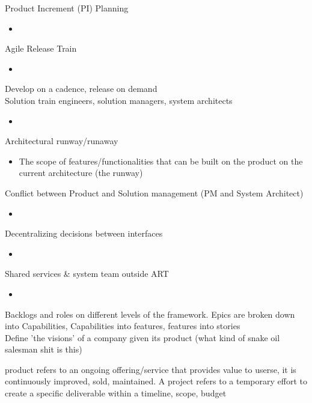 \documentclass[10pt]{article}
\begin{document}
Product Increment (PI) Planning
\begin{itemize}
\item 
\end{itemize}
Agile Release Train
\begin{itemize}
\item 
\end{itemize}
Develop on a cadence, release on demand\\
Solution train engineers, solution managers, system architects
\begin{itemize}
\item 
\end{itemize}
Architectural runway/runaway
\begin{itemize}
\item The scope of features/functionalities that can be built on the product on the current architecture (the runway)
\end{itemize}
Conflict between Product and Solution management (PM and System Architect)
\begin{itemize}
\item 
\end{itemize}
Decentralizing decisions between interfaces
\begin{itemize}
\item 
\end{itemize}
Shared services \& system team outside ART
\begin{itemize}
\item 
\end{itemize}
Backlogs and roles on different levels of the framework. Epics are broken down into Capabilities, Capabilities into features, features into stories\\
Define 'the visions' of a company given its product (what kind of snake oil salesman shit is this)

product refers to an ongoing offering/service that provides value to userse, it is continuously improved, sold, maintained. A project refers to a temporary effort to create a specific deliverable within a timeline, scope, budget
\end{document}
